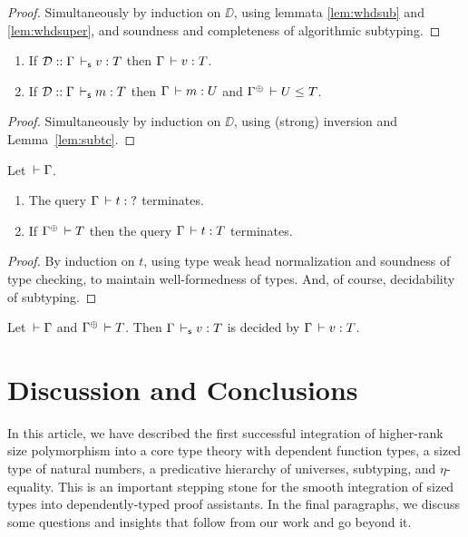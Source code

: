 \documentclass[acmlarge,review,anonymous]{acmart}\settopmatter{printfolios=true}
\begin{document}
\begin{proof}
  Simultaneously by induction on $\DD$, using %
  lemmata \ref{lem:whdsub} and \ref{lem:whdsuper},
  and soundness and completeness of algorithmic subtyping.
\end{proof}
\begin{theorem}
\bla
\begin{enumerate}
\item If\/ $\mathcal{D} :: \Gamma \,\vdash_\mathsf{s} v : T$ then $\Gamma \,\vdash v : T$.
\item If\/ $\mathcal{D} :: \Gamma \,\vdash_\mathsf{s} m : T$ then $\Gamma \,\vdash m : U$ and $\resurrect\Gamma \der U \leq T$.
\end{enumerate}
\end{theorem}
\begin{proof}
Simultaneously by induction on $\DD$, using (strong) inversion and Lemma~\ref{lem:subtc}.
\end{proof}

\begin{lemma}
  Let $\,\vdash \Gamma$.
  \begin{enumerate}
  \item The query $\Gamma \,\vdash t : \mbox{?}$ terminates.
  \item If\/ $\resurrect\Gamma \der T$ then the query $\Gamma \,\vdash t : T$ terminates.
  \end{enumerate}
\end{lemma}
\begin{proof}
  By induction on $t$, using type weak head normalization and soundness of type checking, to maintain well-formedness of types.
  And, of course, decidability of subtyping.
\end{proof}

\begin{theorem}
  Let $\,\vdash \Gamma$ and $\resurrect \Gamma \der T$.
  Then $\Gamma \,\vdash_\mathsf{s} v : T$ is decided by $\Gamma \,\vdash v : T$.
\end{theorem}


\section{Discussion and Conclusions}
\label{sec:concl}

In this article, we have described the first successful integration of higher-rank size polymorphism into a core type theory with dependent function types, a sized type of natural numbers, a predicative hierarchy of universes, subtyping, and $\eta$-equality.  This is an important stepping stone for the smooth integration of sized types into dependently-typed proof assistants.
In the final paragraphs, we discuss some questions and insights that follow from our work and go beyond it.
\end{document}

